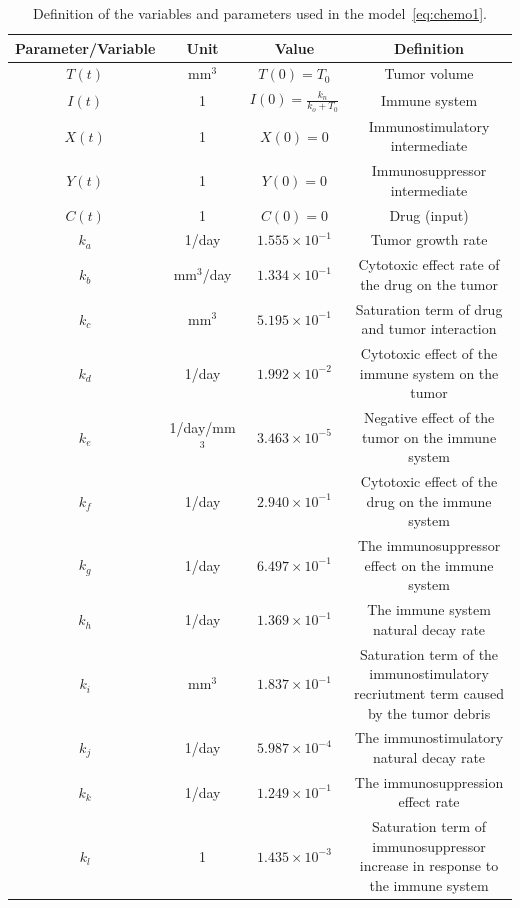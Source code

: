 \begin{landscape}
	\begin{table}
		\centering
		\caption{Definition of the variables and parameters used in the model~\eqref{eq:chemo1}.}
		\begin{tabular}{c c c c}
			\hline
			Parameter/Variable   & Unit          & Value & Definition\\ \hline
			$T(t)$       & mm$^3$         & $T(0)=T_0$& Tumor volume\\ 
			$I(t)$       & 1         & $I(0)=\frac{k_n}{k_o+T_0}$& Immune system \\ 
			$X(t)$       & 1         & $X(0)=0$ & Immunostimulatory intermediate\\ 
			$Y(t)$       & 1         & $Y(0)=0$ & Immunosuppressor intermediate\\ 
			$C(t)$       & 1         & $C(0)=0$ & Drug (input)\\ 
			$k_a$       & 1/day         & $1.555\times 10^{-1}$ & Tumor growth rate\\ 
			$k_b$       & mm$^3$/day    & $1.334\times 10^{-1}$ & Cytotoxic effect rate of the drug on the tumor\\ 
			$k_c$       & mm$^3$        & $5.195\times 10^{-1}$ & Saturation term of drug and tumor interaction \\
			$k_d$       & 1/day         & $1.992\times 10^{-2}$ & Cytotoxic effect of the immune system on the tumor \\ 
			$k_e$       & 1/day/mm$^3$  & $3.463\times 10^{-5}$ & Negative effect of the tumor on the immune system \\ 
			$k_f$       & 1/day         & $2.940\times 10^{-1}$ & Cytotoxic effect of the drug on the immune system\\ 
			$k_g$       & 1/day     & $6.497\times 10^{-1}$ & The immunosuppressor effect on the immune system\\ 
			$k_h$       & 1/day     & $1.369\times 10^{-1}$ & The immune system natural decay rate\\ 
			$k_i$       & mm$^3$    & $1.837\times 10^{-1}$ & Saturation term of the immunostimulatory recriutment term caused by the tumor debris\\ 
			$k_j$       & 1/day     & $5.987\times 10^{-4}$ & The immunostimulatory natural decay rate \\ 
			$k_k$       & 1/day     & $1.249\times 10^{-1}$ & The immunosuppression effect rate \\
			$k_l$       & 1         & $1.435\times10^{-3}$  & Saturation term of immunosuppressor increase in response to the immune system  \\ 

\end{tabular}
\end{table}
\end{landscape}
